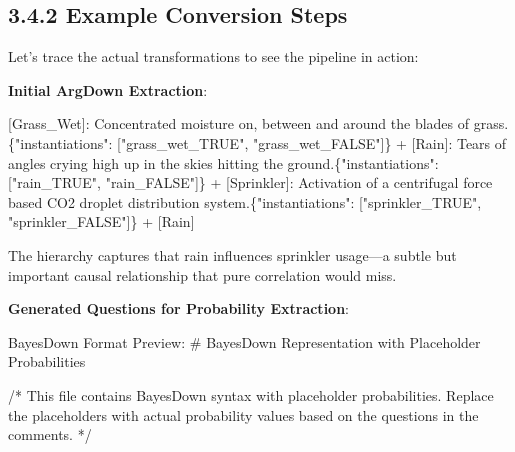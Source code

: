 \documentclass[
  11pt,
  letterpaper,
]{book}
\newenvironment{Shaded}{\begin{snugshade}}{\end{snugshade}}
\newcommand{\CommentTok}[1]{\textcolor[rgb]{0.37,0.37,0.37}{#1}}
\newcommand{\ErrorTok}[1]{\textcolor[rgb]{0.68,0.00,0.00}{#1}}
\newcommand{\NormalTok}[1]{\textcolor[rgb]{0.00,0.23,0.31}{#1}}
\newcommand{\OtherTok}[1]{\textcolor[rgb]{0.00,0.23,0.31}{#1}}
\newcommand{\SpecialStringTok}[1]{\textcolor[rgb]{0.13,0.47,0.30}{#1}}
\begin{document}
\begin{landscape}

\subsection{3.4.2 Example Conversion Steps}\label{sec-rsg-input}

Let's trace the actual transformations to see the pipeline in action:

\textbf{Initial ArgDown Extraction}:

\begin{Shaded}
\begin{Highlighting}[]
\OtherTok{[Grass\_Wet]: }\NormalTok{Concentrated moisture on, between and around the blades of grass.\{"instantiations": }\CommentTok{[}\OtherTok{"grass\_wet\_TRUE", "grass\_wet\_FALSE"}\CommentTok{]}\NormalTok{\}    }
\SpecialStringTok{  + }\CommentTok{[}\OtherTok{Rain}\CommentTok{]}\NormalTok{: Tears of angles crying high up in the skies hitting the ground.\{"instantiations": }\CommentTok{[}\OtherTok{"rain\_TRUE", "rain\_FALSE"}\CommentTok{]}\NormalTok{\}}
\SpecialStringTok{  + }\CommentTok{[}\OtherTok{Sprinkler}\CommentTok{]}\NormalTok{: Activation of a centrifugal force based CO2 droplet distribution system.\{"instantiations": }\CommentTok{[}\OtherTok{"sprinkler\_TRUE", "sprinkler\_FALSE"}\CommentTok{]}\NormalTok{\}}
\SpecialStringTok{      + }\CommentTok{[}\OtherTok{Rain}\CommentTok{]}
\end{Highlighting}
\end{Shaded}

The hierarchy captures that rain influences sprinkler usage---a subtle
but important causal relationship that pure correlation would miss.

\textbf{Generated Questions for Probability Extraction}:

\begin{Shaded}
\begin{Highlighting}[]
\ErrorTok{BayesDown} \ErrorTok{Format} \ErrorTok{Preview:}
\ErrorTok{\#} \ErrorTok{BayesDown} \ErrorTok{Representation} \ErrorTok{with} \ErrorTok{Placeholder} \ErrorTok{Probabilities}

\ErrorTok{/*} \ErrorTok{This} \ErrorTok{file} \ErrorTok{contains} \ErrorTok{BayesDown} \ErrorTok{syntax} \ErrorTok{with} \ErrorTok{placeholder} \ErrorTok{probabilities.}
   \ErrorTok{Replace} \ErrorTok{the} \ErrorTok{placeholders} \ErrorTok{with} \ErrorTok{actual} \ErrorTok{probability} \ErrorTok{values} \ErrorTok{based} \ErrorTok{on} \ErrorTok{the} 
   \ErrorTok{questions} \ErrorTok{in} \ErrorTok{the} \ErrorTok{comments.} \ErrorTok{*/}


\end{Highlighting}
\end{Shaded}
\end{landscape}
\end{document}

